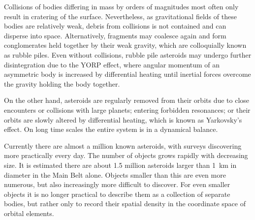         Collisions of bodies differing in mass by orders of magnitudes most often
        only result in cratering of the surface. Nevertheless, as gravitational fields of these bodies
        are relatively weak, debris from collisions is not contained and can disperse into space.
        Alternatively, fragments may coalesce again and form conglomerates held together by their weak gravity,
        which are colloquially known as rubble piles.
        Even without collisions, rubble pile asteroids may undergo further disintegration due to the
        YORP effect,
        where angular momentum of an asymmetric body is increased by differential heating
        until inertial forces overcome the gravity holding the body together.

        On the other hand, asteroids are regularly removed from their orbits due to
        close encounters or collisions with large planets; entering forbidden resonances;
        or their orbits are slowly altered by differential heating, which is known as Yarkovsky's effect.
        On long time scales the entire system is in a dynamical balance.

        Currently there are almost a million known asteroids, with surveys discovering more practically every day.
        The number of objects grows rapidly with decreasing size. It is estimated there are about \num{1.5} million
        asteroids larger than \SI{1}{\kilo\metre} in diameter in the Main Belt alone.
        Objects smaller than this are even more numerous, but also increasingly more difficult to discover.
        For even smaller objects it is no longer practical to describe them as a collection of separate bodies,
        but rather only to record their spatial density in the coordinate space of orbital elements.




